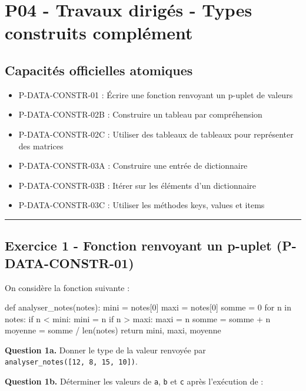 \section{P04 - Travaux dirigés - Types construits complément}

\subsection{Capacités officielles atomiques}

\begin{itemize}
\tightlist
\item
  P-DATA-CONSTR-01 : Écrire une fonction renvoyant un p-uplet de valeurs
\item
  P-DATA-CONSTR-02B : Construire un tableau par compréhension
\item
  P-DATA-CONSTR-02C : Utiliser des tableaux de tableaux pour représenter
  des matrices
\item
  P-DATA-CONSTR-03A : Construire une entrée de dictionnaire
\item
  P-DATA-CONSTR-03B : Itérer sur les éléments d'un dictionnaire
\item
  P-DATA-CONSTR-03C : Utiliser les méthodes keys, values et items
\end{itemize}

\begin{center}\rule{0.5\linewidth}{0.5pt}\end{center}

\subsection{Exercice 1 - Fonction renvoyant un p-uplet (P-DATA-CONSTR-01)}

On considère la fonction suivante :

\begin{python}
def analyser_notes(notes):
    mini = notes[0]
    maxi = notes[0]
    somme = 0
    for n in notes:
        if n < mini:
            mini = n
        if n > maxi:
            maxi = n
        somme = somme + n
    moyenne = somme / len(notes)
    return mini, maxi, moyenne
\end{python}

\textbf{Question 1a.} Donner le type de la valeur renvoyée par
\texttt{analyser\_notes({[}12,\ 8,\ 15,\ 10{]})}.

\textbf{Question 1b.} Déterminer les valeurs de \texttt{a}, \texttt{b}
et \texttt{c} après l'exécution de :


